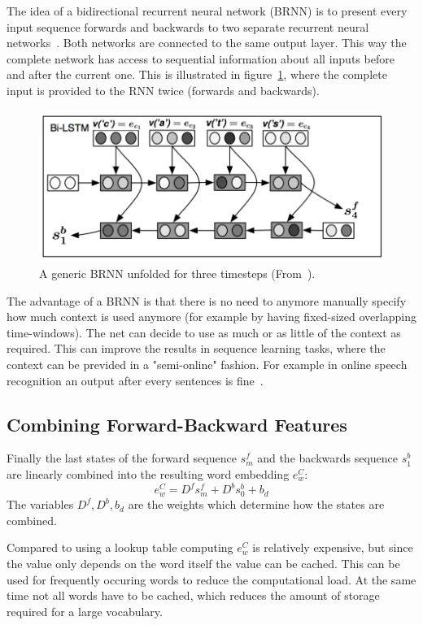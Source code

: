 The idea of a bidirectional recurrent neural network (BRNN) is to present every input sequence forwards and backwards to two separate
recurrent neural networks~\cite{IEEE:journals/singals/Schuster1997}.
Both networks are connected to the same output layer. This way the complete network has access to sequential information 
about all inputs before and after the current one.
This is illustrated in figure~\ref{fig:brnn-unfolded}, where the complete input is provided to the RNN twice (forwards and backwards).
\begin{figure}[H]
\begin{center}
  \includegraphics[width=\textwidth]{./img/brnn-unfolded}
  \caption{A generic BRNN unfolded for three timesteps (From~\cite{IEEE:journals/singals/Schuster1997}).}
  \label{fig:brnn-unfolded}
\end{center}
\end{figure}

The advantage of a BRNN is that there is no need to anymore manually specify how much context is 
used anymore (for example by having fixed-sized overlapping time-windows).
The net can decide to use as much or as little of the context as required. 
This can improve the results in sequence learning tasks, where the context can be previded in a "semi-online" fashion.
For example in online speech recognition an output after every sentences is fine~\cite{DBLP:journals/nn/GravesS05}. 




\subsection{Combining Forward-Backward Features}

Finally the last states of the forward sequence $s_{m}^f$ and the backwards sequence $s_{1}^b$
are linearly combined into the resulting word embedding $e_{w}^C$:
\[
  e_{w}^C = D^f s_{m}^f + D^b s_{0}^b + b_d
\]
The variables $D^f, D^b, b_d$ are the weights which determine how the states are combined.

Compared to using a lookup table computing $e_{w}^C$ is relatively expensive, but since the value only depends on
the word itself the value can be cached. This can be used for frequently occuring words to reduce the computational load.
At the same time not all words have to be cached, which reduces the amount of storage required for a large vocabulary.